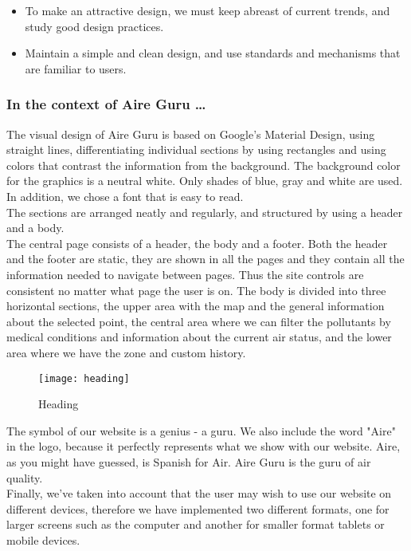\begin{itemize}
    \item To make an attractive design, we must keep abreast of current trends, and study good design practices.
    \item Maintain a simple and clean design, and use standards and mechanisms that are familiar to users.
\end{itemize}

\subsubsection*{In the context of Aire Guru \ldots}

The visual design of Aire Guru is based on Google's Material Design, using straight lines, differentiating individual sections by using rectangles
and using colors that contrast the information from the background.
The background color for the graphics is a neutral white.
Only shades of blue, gray and white are used. In addition, we chose a font that is easy to read.\\

The sections are arranged neatly and regularly, and structured by using a header and a body.\\

The central page consists of a header, the body and a footer. Both the header and the footer are static,
they are shown in all the pages and they contain all the information needed to navigate between pages. Thus the site controls are consistent no matter what page the user is on.
The body is divided into three horizontal sections, the upper area with the map and the general information about the selected point,
the central area where we can filter the pollutants by medical conditions and information about the current air status, and the
lower area where we have the zone and custom history.\\

\begin{figure}[ht]
    \centering
    \texttt{[image: heading]}
    \caption{Heading}
\end{figure}
 
The symbol of our website is a genius - a guru. We also include the word "Aire" in the logo, because it perfectly represents 
what we show with our website. Aire, as you might have guessed, is Spanish for Air. Aire Guru is the guru of air quality. \\

Finally, we've taken into account that the user may wish to use our website on different devices, therefore we have implemented
two different formats, one for larger screens such as the computer and another for smaller format tablets or mobile devices.